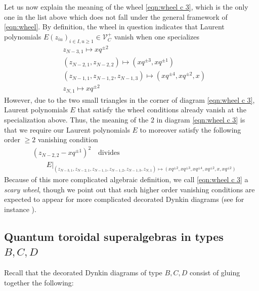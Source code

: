 \documentclass{amsart}
\def\CV{{\mathcal{V}}}
\begin{document}
Let us now explain the meaning of the wheel \eqref{eqn:wheel c 3}, which is the only one in the list above which does not fall under the general framework of \eqref{eqn:wheel}. By definition, the wheel in question indicates that Laurent polynomials $E(z_{iu})_{i \in I, u \geq 1} \in \CV^+_C$ vanish when one specializes
\begin{align*}
&z_{N-3,1} \mapsto xq^{\pm 2} \\
&(z_{N-2,1}, z_{N-2,2}) \mapsto (xq^{\pm 3}, xq^{\pm 1}) \\
&(z_{N-1,1}, z_{N-1,2}, z_{N-1,3}) \mapsto (xq^{\pm 4}, xq^{\pm 2},x) \\
&z_{N,1} \mapsto xq^{\pm 2} 
\end{align*} 
However, due to the two small triangles in the corner of diagram \eqref{eqn:wheel c 3}, Laurent polynomials $E$ that satisfy the wheel conditions already vanish at the specialization above. Thus, the meaning of the $\boxed{2}$ in diagram \eqref{eqn:wheel c 3} is that we require our Laurent polynomials $E$ to moreover satisfy the following order $\geq 2$ vanishing condition
\begin{equation}
\label{eqn:rigorous}
\begin{split}
& (z_{N-2,2}-xq^{\pm 1})^2 \quad \text{divides} \\ 
& \qquad E \Big|_{(z_{N-3,1},z_{N-2,1},z_{N-1,1},z_{N-1,2},z_{N-1,3},z_{N,1}) \mapsto (xq^{\pm 2},xq^{\pm 3},xq^{\pm 4},xq^{\pm 2},x,xq^{\pm 2})}
\end{split}
\end{equation} 
Because of this more complicated algebraic definition, we call \eqref{eqn:wheel c 3} a \emph{scary wheel}, though we point out that such higher order vanishing conditions are expected to appear for more complicated decorated Dynkin diagrams (see for instance \cite{N Symm}).

\medskip 

\subsection{Quantum toroidal superalgebras in types $B,C,D$}
\label{sub:toroidal b,c,d}

Recall that the decorated Dynkin diagrams of type $B,C,D$ consist of gluing together the following:

\medskip 
\end{document}
